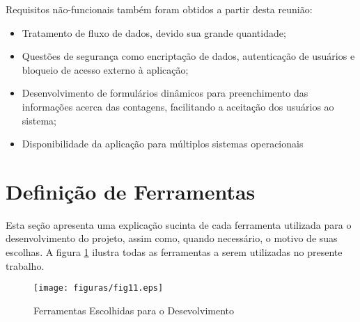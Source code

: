 Requisitos não-funcionais também foram obtidos a partir desta reunião:

\begin{itemize}

  \item Tratamento de fluxo de dados, devido sua grande quantidade;

  \item Questões de segurança como encriptação de dados, autenticação de usuários e bloqueio de acesso externo à aplicação;

  \item Desenvolvimento de formulários dinâmicos para preenchimento das informações acerca das contagens, facilitando a aceitação dos usuários ao sistema;

  \item Disponibilidade da aplicação para múltiplos sistemas operacionais

\end{itemize}

\section{Definição de Ferramentas}

Esta seção apresenta uma explicação sucinta de cada ferramenta utilizada para o desenvolvimento do projeto, assim como, quando necessário, o motivo de suas escolhas. A figura \ref{fig11} ilustra todas as ferramentas a serem utilizadas no presente trabalho.

\begin{figure}[ht]
	\centering
	\texttt{[image: figuras/fig11.eps]}
	\caption{Ferramentas Escolhidas para o Desevolvimento}
	\label{fig11}
\end{figure}

